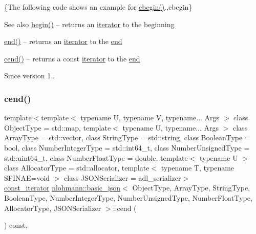 \{The following code shows an example for {\ttfamily \mbox{\hyperlink{classnlohmann_1_1basic__json_ad865d6c291b237ae508d5cb2146b5877}{cbegin()}}}.,cbegin\}

\begin{DoxySeeAlso}{See also}
\mbox{\hyperlink{classnlohmann_1_1basic__json_a0ff28dac23f2bdecee9564d07f51dcdc}{begin()}} -- returns an \mbox{\hyperlink{classnlohmann_1_1basic__json_a099316232c76c034030a38faa6e34dca}{iterator}} to the beginning 

\mbox{\hyperlink{classnlohmann_1_1basic__json_a13e032a02a7fd8a93fdddc2fcbc4763c}{end()}} -- returns an \mbox{\hyperlink{classnlohmann_1_1basic__json_a099316232c76c034030a38faa6e34dca}{iterator}} to the \mbox{\hyperlink{classnlohmann_1_1basic__json_a13e032a02a7fd8a93fdddc2fcbc4763c}{end}} 

\mbox{\hyperlink{classnlohmann_1_1basic__json_a8dba7b7d2f38e6b0c614030aa43983f6}{cend()}} -- returns a const \mbox{\hyperlink{classnlohmann_1_1basic__json_a099316232c76c034030a38faa6e34dca}{iterator}} to the \mbox{\hyperlink{classnlohmann_1_1basic__json_a13e032a02a7fd8a93fdddc2fcbc4763c}{end}}
\end{DoxySeeAlso}
\begin{DoxySince}{Since}
version 1.. 
\end{DoxySince}
\mbox{\label{classnlohmann_1_1basic__json_a8dba7b7d2f38e6b0c614030aa43983f6}} 
\subsubsection{\texorpdfstring{cend()}{cend()}}
{\footnotesize\ttfamily template$<$template$<$ typename U, typename V, typename... Args $>$ class Object\+Type = std\+::map, template$<$ typename U, typename... Args $>$ class Array\+Type = std\+::vector, class String\+Type  = std\+::string, class Boolean\+Type  = bool, class Number\+Integer\+Type  = std\+::int64\+\_\+t, class Number\+Unsigned\+Type  = std\+::uint64\+\_\+t, class Number\+Float\+Type  = double, template$<$ typename U $>$ class Allocator\+Type = std\+::allocator, template$<$ typename T, typename S\+F\+I\+N\+A\+E=void $>$ class J\+S\+O\+N\+Serializer = adl\+\_\+serializer$>$ \\
\mbox{\hyperlink{classnlohmann_1_1basic__json_a41a70cf9993951836d129bb1c2b3126a}{const\+\_\+iterator}} \mbox{\hyperlink{classnlohmann_1_1basic__json}{nlohmann\+::basic\+\_\+json}}$<$ Object\+Type, Array\+Type, String\+Type, Boolean\+Type, Number\+Integer\+Type, Number\+Unsigned\+Type, Number\+Float\+Type, Allocator\+Type, J\+S\+O\+N\+Serializer $>$\+::cend (\begin{DoxyParamCaption}{ }\end{DoxyParamCaption}) const\hspace{0.3cm}{\ttfamily [inline]}, {\ttfamily [noexcept]}}



